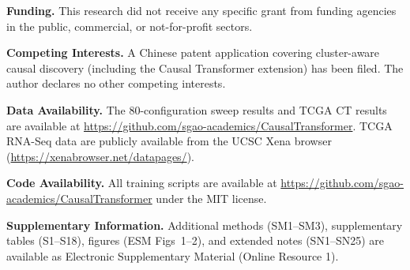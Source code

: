 \documentclass[12pt,a4paper]{article}
\begin{document}
\noindent\textbf{Funding.} This research did not receive any specific grant from funding agencies in the public, commercial, or not-for-profit sectors.

\noindent\textbf{Competing Interests.} A Chinese patent application covering cluster-aware causal discovery (including the Causal Transformer extension) has been filed. The author declares no other competing interests.

\noindent\textbf{Data Availability.} The 80-configuration sweep results and TCGA CT results are available at \url{https://github.com/sgao-academics/CausalTransformer}. TCGA RNA-Seq data are publicly available from the UCSC Xena browser (\url{https://xenabrowser.net/datapages/}).

\noindent\textbf{Code Availability.} All training scripts are available at \url{https://github.com/sgao-academics/CausalTransformer} under the MIT license.

\noindent\textbf{Supplementary Information.} Additional methods (SM1--SM3), supplementary tables (S1--S18), figures (ESM Figs~1--2), and extended notes (SN1--SN25) are available as Electronic Supplementary Material (Online Resource 1).


\end{document}
